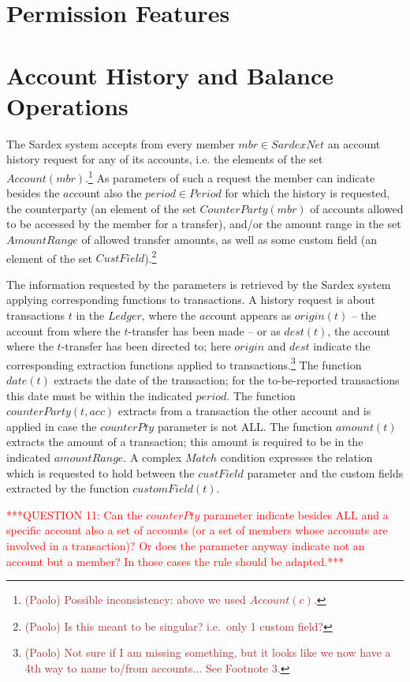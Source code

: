 \section{Permission Features}
\section{Account History and Balance Operations}
\label{sect:accHistory}

The Sardex system accepts from every member $mbr \in SardexNet$ an account history request for any of its accounts, i.e. the elements of  the set $Account(mbr)$.\footnote{\textcolor{brown}{(Paolo) Possible inconsistency: above we used $Account(c)$.}} As parameters of such a request the member can indicate besides the $acc$ount also the $period \in Period$ for which the history is requested, the counterparty (an element of the set $CounterParty(mbr)$  of accounts allowed to be accessed by the member for a transfer), and/or the amount range in the set $AmountRange$ of allowed transfer amounts, as well as some custom field (an element of the set $CustField$).\footnote{\textcolor{brown}{(Paolo) Is this meant to be singular? i.e.\ only 1 custom field?}}

The information requested by the parameters is retrieved by the Sardex system applying corresponding functions to transactions. A  history request is about transactions $t$ in the $Ledger$, where the $acc$ount appears as $origin(t)$ -- the account from where the $t$-transfer has been made -- or as $dest(t)$, the account where the $t$-transfer has been directed to; here $origin$ and $dest$ 
indicate the corresponding extraction functions applied to transactions.\footnote{\textcolor{brown}{(Paolo) Not sure if I am missing something, but it looks like we now have a 4th way to name to/from accounts... See Footnote 3.}} The function $date(t)$ extracts the date of the transaction; for the to-be-reported transactions this date must be within the indicated $period$. The function $counterParty(t, acc)$ extracts from a transaction the other account and is applied in case the $counterPty$ parameter is not ALL. The function $amount(t)$  extracts the amount of a transaction; this amount is required to be in the indicated $amountRange$. A complex $Match$ condition expresses the relation which is requested to hold between the $custField$ parameter and the custom fields extracted by the function $customField(t)$. 

\vspace{12pt}
\textcolor{red}{***QUESTION 11: Can the $counterPty$ parameter indicate besides ALL and a specific account also a set of accounts (or a set of members whose accounts are involved in a transaction)? Or does the parameter anyway indicate not an account but a member? In those cases the rule should be adapted.***}
\vspace{12pt}


